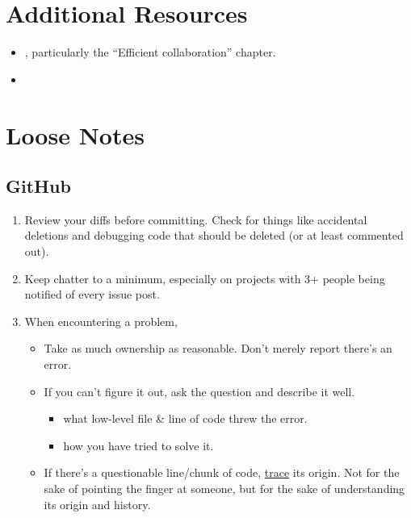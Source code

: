 \documentclass[
]{book}
\providecommand{\tightlist}{%
  \setlength{\itemsep}{0pt}\setlength{\parskip}{0pt}}
\begin{document}
\hypertarget{additional-resources}{%
\section{Additional Resources}\label{additional-resources}}

\begin{itemize}
\tightlist
\item
  \citep{gillespie}, particularly the ``Efficient collaboration'' chapter.
\item
  \citep{fitzpatrick}
\end{itemize}

\hypertarget{loose-notes}{%
\section{Loose Notes}\label{loose-notes}}

\hypertarget{github}{%
\subsection{GitHub}\label{github}}

\begin{enumerate}
\def\labelenumi{\arabic{enumi}.}
\item
  Review your diffs before committing. Check for things like accidental deletions and debugging code that should be deleted (or at least commented out).
\item
  Keep chatter to a minimum, especially on projects with 3+ people being notified of every issue post.
\item
  When encountering a problem,

  \begin{itemize}
  \tightlist
  \item
    Take as much ownership as reasonable. Don't merely report there's an error.
  \item
    If you can't figure it out, ask the question and describe it well.

    \begin{itemize}
    \tightlist
    \item
      what low-level file \& line of code threw the error.
    \item
      how you have tried to solve it.
    \end{itemize}
  \item
    If there's a questionable line/chunk of code, \href{https://help.github.com/articles/tracing-changes-in-a-file/}{trace} its origin. Not for the sake of pointing the finger at someone, but for the sake of understanding its origin and history.
  \end{itemize}
\end{enumerate}
\end{document}
